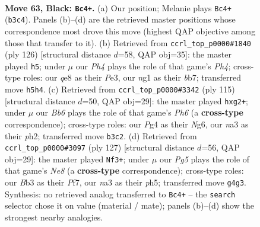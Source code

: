 \documentclass[11pt]{article}
\begin{document}
\clearpage

\begin{figure}[p]\centering
\begin{subfigure}{0.46\textwidth}\centering
\resizebox{\linewidth}{!}{%
\newchessgame
\chessboard[
  setfen={4Q3/8/p4k2/3P3p/6p1/Nb2Q3/5P1q/5KN1 b - - 0 63},
  showmover=false,
  pgfstyle=straightmove, color=movearrow, markmove={b3-c4}
]}
\caption{}
\end{subfigure}\hfill
\begin{subfigure}{0.46\textwidth}\centering
\resizebox{\linewidth}{!}{%
\newchessgame
\chessboard[
  setfen={1Q6/1b3ppk/2q5/6P1/7P/P1B1P1K1/8/8 w - - 5 64},
  showmover=false,
  pgfstyle=straightmove, color=movearrow, markmove={h4-h5}
]}
\caption{}
\end{subfigure}
\\[4pt]
\begin{subfigure}{0.46\textwidth}\centering
\resizebox{\linewidth}{!}{%
\newchessgame
\chessboard[
  setfen={8/3P4/6n1/p7/8/5Q1p/1k1qN1PP/7K b - - 0 58},
  showmover=false,
  pgfstyle=straightmove, color=movearrow, markmove={h3-g2}
]}
\caption{}
\end{subfigure}\hfill
\begin{subfigure}{0.46\textwidth}\centering
\resizebox{\linewidth}{!}{%
\newchessgame
\chessboard[
  setfen={7k/5p2/7p/7P/P5Q1/3pN1P1/4qP2/4n1K1 b - - 8 64},
  showmover=false,
  pgfstyle=straightmove, color=movearrow, markmove={e1-f3}
]}
\caption{}
\end{subfigure}
\caption{\textbf{Move 63, Black: \texttt{Bc4+}.} (a) Our position; Melanie plays \texttt{Bc4+} (\texttt{b3c4}). Panels (b)--(d) are the retrieved master positions whose correspondence most drove this move (highest QAP objective among those that transfer to it). (b) Retrieved from \texttt{ccrl\_top\_p0000\#1840} (ply 126) [structural distance $d$=58, QAP obj=35]: the master played \texttt{h5}; under $\mu$ our \emph{Ph4} plays the role of that game's \emph{Ph4}; cross-type roles: our \emph{q}e8 as their \emph{P}e3, our \emph{n}g1 as their \emph{b}b7; transferred move \texttt{h5h4}. (c) Retrieved from \texttt{ccrl\_top\_p0000\#3342} (ply 115) [structural distance $d$=50, QAP obj=29]: the master played \texttt{hxg2+}; under $\mu$ our \emph{Bb6} plays the role of that game's \emph{Ph6} (a \textbf{cross-type} correspondence); cross-type roles: our \emph{P}g4 as their \emph{N}g6, our \emph{n}a3 as their \emph{p}h2; transferred move \texttt{b3c2}. (d) Retrieved from \texttt{ccrl\_top\_p0000\#3097} (ply 127) [structural distance $d$=56, QAP obj=29]: the master played \texttt{Nf3+}; under $\mu$ our \emph{Pg5} plays the role of that game's \emph{Ne8} (a \textbf{cross-type} correspondence); cross-type roles: our \emph{B}b3 as their \emph{P}f7, our \emph{n}a3 as their \emph{p}h5; transferred move \texttt{g4g3}. Synthesis: no retrieved analog transferred to \texttt{Bc4+} -- the \texttt{search} selector chose it on value (material / mate); panels (b)--(d) show the strongest nearby analogies.}
\label{fig:thought-m125}
\end{figure}
\end{document}
